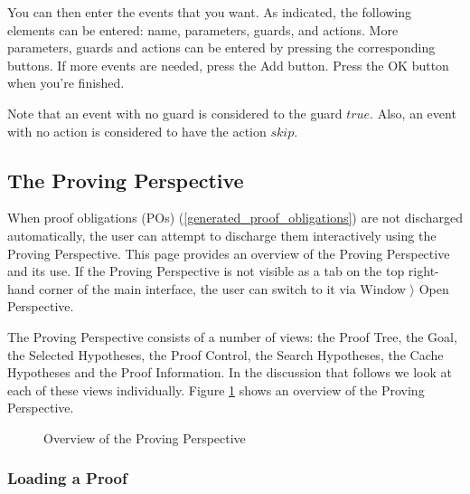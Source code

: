 You can then enter the events that you want. As indicated, the following elements can be entered: name, parameters, guards, and actions. More parameters, guards and actions can be entered by pressing the corresponding buttons. If more events are needed, press the \textsf{Add} button. Press the \textsf{OK} button when you're finished.

Note that an event with no guard is considered to the guard $true$. Also, an event with no action is considered to have the action $skip$. 

\subsection{The Proving Perspective}
\label{proving_perspective}

When proof obligations (POs) (\ref{generated_proof_obligations}) are not discharged automatically, the user can attempt to discharge them interactively using the Proving Perspective. This page provides an overview of the Proving Perspective and its use. If the Proving Perspective is not visible as a tab on the top right-hand corner of the main interface, the user can switch to it via \textsf{Window $\rangle$ Open Perspective}.

The Proving Perspective consists of a number of views: the \textsf{Proof Tree}, the \textsf{Goal}, the \textsf{Selected Hypotheses}, the \textsf{Proof Control}, the \textsf{Search Hypotheses}, the \textsf{Cache Hypotheses} and the \textsf{Proof Information}. In the discussion that follows we look at each of these views individually. Figure \ref{fig_ref_01_proving_perspective1} shows an overview of the Proving Perspective.

\ifinprint
\begin{figure}
  \begin{center}
    \caption{Overview of the Proving Perspective}
    \label{fig_ref_01_proving_perspective1}
  \end{center}
\end{figure}
\else
{}
\fi

\subsubsection{Loading a Proof}

